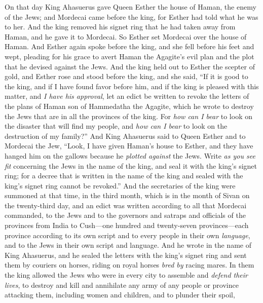 \begin{biblechapter} %
 On that day King Ahasuerus gave Queen Esther the house of Haman, the enemy of the Jews; and Mordecai came before the king, for Esther had told what he was to her.
\verse And the king removed his signet ring that he had taken away from Haman, and he gave it to Mordecai. So Esther set Mordecai over the house of Haman.
\verse And Esther again spoke before the king, and she fell before his feet and wept, pleading for his grace to avert Haman the Agagite’s evil plan and the plot that he devised against the Jews.
\verse And the king held out to Esther the scepter of gold, and Esther rose and stood before the king,
\verse and she said, “If it is good to the king, and if I have found favor before him, and if the king is pleased with this matter, and \textit{I have his approval}, let an edict be written to revoke the letters of the plans of Haman son of Hammedatha the Agagite, which he wrote to destroy the Jews that are in all the provinces of the king.
\verse For \textit{how can I bear} to look on the disaster that will find my people, and \textit{how can I bear} to look on the destruction of my family?”
\verse And King Ahasuerus said to Queen Esther and to Mordecai the Jew, “Look, I have given Haman’s house to Esther, and they have hanged him on the gallows because he \textit{plotted against} the Jews.
\verse Write \textit{as you see fit} concerning the Jews in the name of the king, and seal it with the king’s signet ring; for a decree that is written in the name of the king and sealed with the king’s signet ring cannot be revoked.”
\verse And the secretaries of the king were summoned at that time, in the third month, which is in the month of Sivan on the twenty-third day, and an edict was written according to all that Mordecai commanded, to the Jews and to the governors and satraps and officials of the provinces from India to Cush—one hundred and twenty-seven provinces—each province according to its own script and to every people in their own \textit{language}, and to the Jews in their own script and language.
\verse And he wrote in the name of King Ahasuerus, and he sealed the letters with the king’s signet ring and sent them by couriers on horses, riding on royal horses \textit{bred by} racing mares.
\verse In them the king allowed the Jews who were in every city to assemble and \textit{defend their lives}, to destroy and kill and annihilate any army of any people or province attacking them, including women and children, and to plunder their spoil,

\end{biblechapter}
